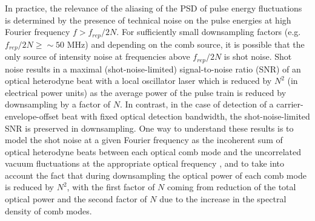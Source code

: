 In practice, the relevance of the aliasing of the PSD of pulse energy fluctuations is determined by the presence of technical noise on the pulse energies at high Fourier frequency $f > f_{rep}/2N$. For sufficiently small downsampling factors (e.g. $f_{rep}/2N\geq\sim50$ MHz) and depending on the comb source, it is possible that the only source of intensity noise at frequencies above $f_{rep}/2N$ is shot noise. Shot noise results in a maximal (shot-noise-limited) signal-to-noise ratio (SNR) of an optical heterodyne beat with a local oscillator laser which is reduced by $N^2$ (in electrical power units) as the average power of the pulse train is reduced by downsampling by a factor of $N$. In contrast, in the case of detection of a carrier-envelope-offset beat with fixed optical detection bandwidth, the shot-noise-limited SNR is preserved in downsampling. One way to understand these results is to model the shot noise at a given Fourier frequency as the incoherent sum of optical heterodyne beats between each optical comb mode and the uncorrelated vacuum fluctuations at the appropriate optical frequency \cite{Bachor1990,Quinlan2013}, and to take into account the fact that during downsampling the optical power of each comb mode is reduced by $N^2$, with the first factor of $N$ coming from reduction of the total optical power and the second factor of $N$ due to the increase in the spectral density of comb modes. 

